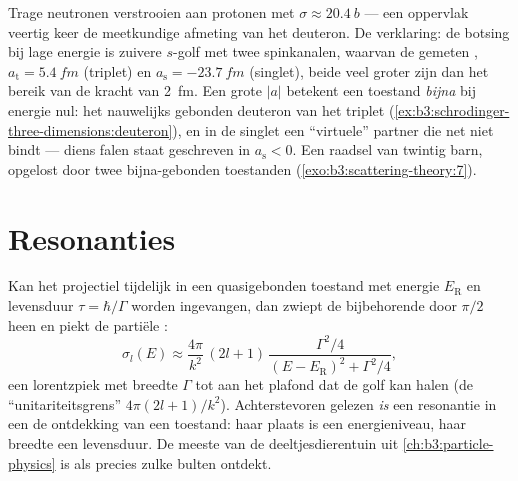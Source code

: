 \begin{example}\label{ex:b3:scattering-theory:np}
Trage neutronen verstrooien aan protonen met $\sigma \approx
\qty{20.4}{b}$ --- een oppervlak veertig keer de meetkundige afmeting van
het deuteron. De verklaring: de botsing bij lage energie is zuivere
$s$-golf met twee spinkanalen, waarvan de gemeten ,
$a_{\text{t}} = \qty{5.4}{fm}$ (triplet) en $a_{\text{s}} =
\qty{-23.7}{fm}$ (singlet), beide veel groter zijn dan het bereik van de
kracht van \qty{2}{fm}. Een grote $|a|$ betekent een toestand \emph{bijna}
bij energie nul: het nauwelijks gebonden deuteron van het triplet
(\cref{ex:b3:schrodinger-three-dimensions:deuteron}), en in de singlet een
``virtuele'' partner die net niet bindt --- diens falen staat geschreven in
$a_{\text{s}} < 0$. Een raadsel van twintig barn, opgelost door twee
bijna-gebonden toestanden
(\cref{exo:b3:scattering-theory:7}).
\end{example}

\section{Resonanties}

\begin{proposition}\label{prop:b3:scattering-theory:resonance}
Kan het projectiel tijdelijk in een quasigebonden toestand met energie
$E_{\text{R}}$ en levensduur $\tau = \hbar/\Gamma$ worden ingevangen, dan
zwiept de bijbehorende  door $\pi/2$ heen en piekt de
partiële :
\[
\sigma_l(E) \approx \frac{4\pi}{k^2}\,(2l+1)\,
\frac{\Gamma^2/4}{(E - E_{\text{R}})^2 + \Gamma^2/4} ,
\]
een lorentzpiek met breedte $\Gamma$ tot aan het plafond dat de golf kan
halen (de ``unitariteitsgrens'' $4\pi(2l+1)/k^2$). Achterstevoren gelezen
\emph{is} een resonantie in een  de ontdekking van een
toestand: haar plaats is een energieniveau, haar breedte een levensduur.
De meeste van de deeltjesdierentuin uit \cref{ch:b3:particle-physics} is
als precies zulke bulten ontdekt.
\end{proposition}
\admitted

